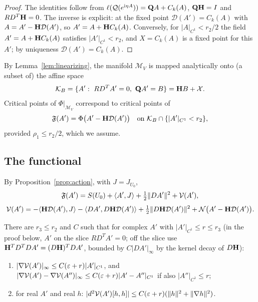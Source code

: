 \begin{proof}
The identities follow from $\ell(\mathcal Q(e^{\mathrm i\eta A}))=\mathbf Q A+C_k(A)$, $\mathbf Q\mathbf H=I$ and $RD^T\mathbf H=0$. The inverse is explicit: at the fixed point $\mathcal D(A')=C_k(A)$ with $A=A'-\mathbf H\mathcal D(A')$, so $A'=A+\mathbf H C_k(A)$. Conversely, for $|A|_{C^1}<r_2/2$ the field $A'=A+\mathbf H C_k(A)$ satisfies $|A'|_{C^1}<r_2$, and $X=C_k(A)$ is a fixed point for this $A'$; by uniqueness $\mathcal D(A')=C_k(A)$.
\end{proof}

By Lemma~\ref{lem:linearizing}, the manifold $\mathcal M_V$ is mapped analytically onto (a subset of) the affine space
\[
\mathcal K_B=\{A':\ RD^TA'=0,\ \mathbf Q A'=B\}=\mathbf H B+\mathcal X .
\]
Critical points of $\Phi|_{\mathcal M_V}$ correspond to critical points of
\[
\mathfrak F(A')=\Phi\big(A'-\mathbf H\mathcal D(A')\big)\quad\text{on }\mathcal K_B\cap\{|A'|_{C^1}<r_2\},
\]
provided $\rho_1\le r_2/2$, which we assume.

\subsection{The functional}

By Proposition~\ref{prop:action}, with $J=J_{U_0}$,
\begin{equation}\label{eq:F-expansion}
\mathfrak F(A')=S(U_0)+\langle A',J\rangle+\tfrac12\|DA'\|^2+\mathcal V(A'),
\end{equation}
\[
\mathcal V(A')=-\langle \mathbf H\mathcal D(A'),J\rangle-\langle DA',D\mathbf H\mathcal D(A')\rangle+\tfrac12\|D\mathbf H\mathcal D(A')\|^2+\mathcal N\big(A'-\mathbf H\mathcal D(A')\big).
\]

\begin{lemma}\label{lem:V-bounds}
There are $r_3\le r_2$ and $C$ such that for complex $A'$ with $|A'|_{C^1}\le r\le r_3$ (in the proof below, $A'$ on the slice $RD^TA'=0$; off the slice use $\mathbf H^TD^TDA'=(D\mathbf H)^TDA'$, bounded by $C|DA'|_\infty$ by the kernel decay of $D\mathbf H$):
\begin{enumerate}[label=(\alph*)]
\item $|\nabla\mathcal V(A')|_\infty\le C(\varepsilon+r)|A'|_{C^1}$, and $|\nabla\mathcal V(A')-\nabla\mathcal V(A'')|_\infty\le C(\varepsilon+r)|A'-A''|_{C^1}$ if also $|A''|_{C^1}\le r$;
\item for real $A'$ and real $h$: $|d^2\mathcal V(A')[h,h]|\le C(\varepsilon+r)(\|h\|^2+\|\nabla h\|^2)$.
\end{enumerate}
\end{lemma}

